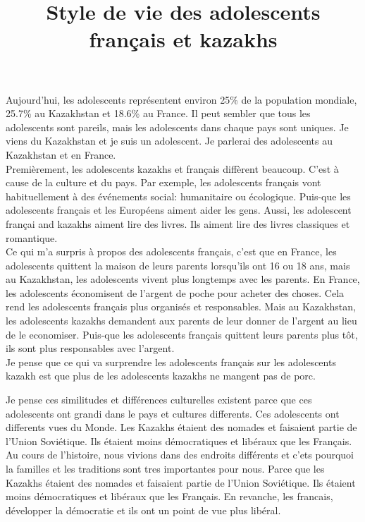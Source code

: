 \documentclass[a4paper, 12pt]{article}
\title{Style de vie des adolescents français et kazakhs}
\author{}
\date{}
\begin{document}
\maketitle
{}

Aujourd'hui, les adolescents représentent environ 25\% \cite{teenagers} de la population mondiale, 25.7\% au Kazakhstan et 18.6\% au France. Il peut sembler que tous les adolescents sont pareils, mais les adolescents dans chaque pays sont uniques. Je viens du Kazakhstan et je suis un adolescent. Je parlerai des adolescents au Kazakhstan et en France. \\

Premièrement, les adolescents kazakhs et français diffèrent beaucoup.
C'est à cause de la culture et du pays.
Par exemple, les adolescents français vont habituellement à des événements social: humanitaire ou écologique.
Puis-que les adolescents français et les Européens aiment aider les gens.
Aussi, les adolescent françai and kazakhs aiment lire des livres. \cite{hobbies}
Ils aiment lire des livres classiques et romantique.\\ 

Ce qui m'a surpris à propos des adolescents français, c'est que en France, les adolescents quittent la maison de leurs parents lorsqu'ils ont 16 ou 18 ans, mais au Kazakhstan, les adolescents vivent plus longtemps avec les parents.
En France, les adolescents économisent de l'argent de poche pour acheter des choses.
Cela rend les adolescents français plus organisés et responsables.
Mais au Kazakhstan, les adolescents kazakhs demandent aux parents de leur donner de l'argent au lieu de le economiser.
Puis-que les adolescents français quittent leurs parents plus tôt, ils sont plus responsables avec l'argent.\\

Je pense que ce qui va surprendre les adolescents français sur les adolescents kazakh est que plus de les adolescents kazakhs ne mangent pas de porc. 

Je pense ces similitudes et différences culturelles existent parce que ces adolescents ont grandi dans le pays et cultures differents.
Ces adolescents ont differents vues du Monde.
Les Kazakhs étaient des nomades et faisaient partie de l'Union Soviétique.
Ils étaient moins démocratiques et libéraux que les Français.
Au cours de l'histoire, nous vivions dans des endroits différents et c'ets pourquoi la familles et les traditions sont tres importantes pour nous.
Parce que les Kazakhs étaient des nomades et faisaient partie de l'Union Soviétique.
Ils étaient moins démocratiques et libéraux que les Français.
En revanche, les francais, développer la démocratie et ils ont un point de vue plus libéral.\\
\end{document}

